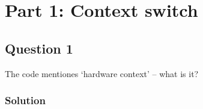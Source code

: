 \section*{Part 1: Context switch}

\subsection*{Question 1}

The code mentiones `hardware context' – what is it?

\subsubsection*{Solution}

